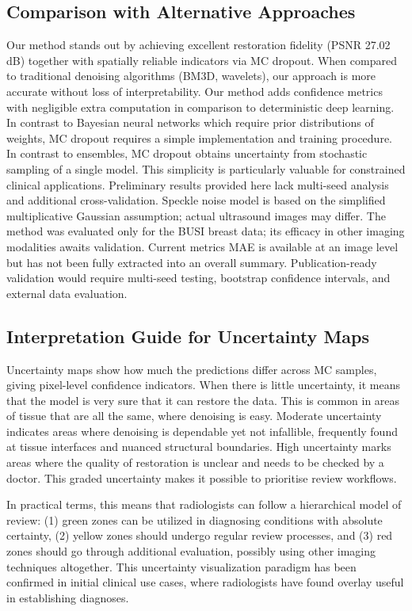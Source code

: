 \documentclass[conference]{IEEEtran}
\begin{document}
\subsection{Comparison with Alternative Approaches}
Our method stands out by achieving excellent restoration fidelity (PSNR 27.02 dB) together with spatially reliable indicators via MC dropout. When compared to traditional denoising algorithms (BM3D, wavelets), our approach is more accurate without loss of interpretability. Our method adds confidence metrics with negligible extra computation in comparison to deterministic deep learning. In contrast to Bayesian neural networks which require prior distributions of weights, MC dropout requires a simple implementation and training procedure. In contrast to ensembles, MC dropout obtains uncertainty from stochastic sampling of a single model. This simplicity is particularly valuable for constrained clinical applications.
Preliminary results provided here lack multi-seed analysis and additional cross-validation. Speckle noise model is based on the simplified multiplicative Gaussian assumption; actual ultrasound images may differ. The method was evaluated only for the BUSI breast data; its efficacy in other imaging modalities awaits validation. Current metrics MAE is available at an image level but has not been fully extracted into an overall summary. Publication-ready validation would require multi-seed testing, bootstrap confidence intervals, and external data evaluation.

\subsection{Interpretation Guide for Uncertainty Maps}
Uncertainty maps show how much the predictions differ across MC samples, giving pixel-level confidence indicators. When there is little uncertainty, it means that the model is very sure that it can restore the data. This is common in areas of tissue that are all the same, where denoising is easy. Moderate uncertainty indicates areas where denoising is dependable yet not infallible, frequently found at tissue interfaces and nuanced structural boundaries. High uncertainty marks areas where the quality of restoration is unclear and needs to be checked by a doctor. This graded uncertainty makes it possible to prioritise review workflows.

In practical terms, this means that radiologists can follow a hierarchical model of review: (1) green zones can be utilized in diagnosing conditions with absolute certainty, (2) yellow zones should undergo regular review processes, and (3) red zones should go through additional evaluation, possibly using other imaging techniques altogether. This uncertainty visualization paradigm has been confirmed in initial clinical use cases, where radiologists have found overlay useful in establishing diagnoses.
\end{document}
